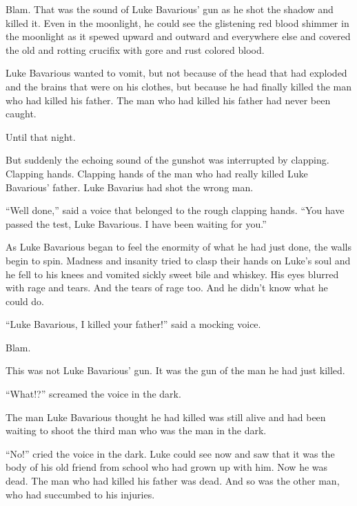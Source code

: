 Blam. That was the sound of Luke Bavarious' gun as he shot
the shadow and killed it. Even in the moonlight, he could see the
glistening red blood shimmer in the moonlight as it spewed upward
and outward and everywhere else and covered the old and rotting
crucifix with gore and rust colored blood.



Luke Bavarious wanted to vomit, but not because of the head that
had exploded and the brains that were on his clothes, but because
he had finally killed the man who had killed his father. The man
who had killed his father had never been caught.



Until that night.



But suddenly the echoing sound of the gunshot was interrupted by
clapping. Clapping hands. Clapping hands of the man who had really
killed Luke Bavarious' father. Luke Bavarius had shot the
wrong man.



``Well done,'' said a voice that belonged to the rough
clapping hands. ``You have passed the test, Luke Bavarious. I
have been waiting for you.''



As Luke Bavarious began to feel the enormity of what he had just
done, the walls begin to spin. Madness and insanity tried to clasp
their hands on Luke's soul and he fell to his knees and
vomited sickly sweet bile and whiskey. His eyes blurred with rage
and tears. And the tears of rage too. And he didn't know what
he could do.



``Luke Bavarious, I killed your father!'' said a mocking
voice.



Blam.



This was not Luke Bavarious' gun. It was the gun of the man
he had just killed.



``What!?'' screamed the voice in the dark.



The man Luke Bavarious thought he had killed was still alive and
had been waiting to shoot the third man who was the man in the
dark.



``No!'' cried the voice in the dark. Luke could see now
and saw that it was the body of his old friend from school who had
grown up with him. Now he was dead. The man who had killed his
father was dead. And so was the other man, who had succumbed to his
injuries.



